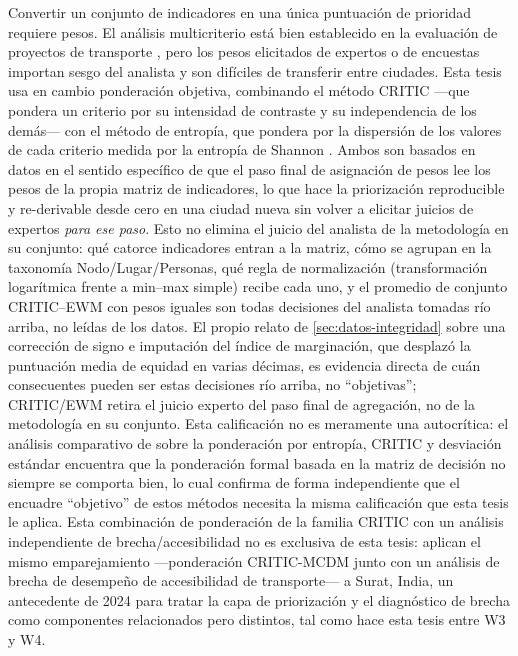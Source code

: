 Convertir un conjunto de indicadores en una única puntuación de prioridad requiere pesos.
El análisis multicriterio está bien establecido en la evaluación de proyectos de transporte
\parencite{macharis2015}, pero los pesos elicitados de expertos o de encuestas importan
sesgo del analista y son difíciles de transferir entre ciudades. Esta tesis usa en cambio
ponderación objetiva, combinando el método CRITIC \parencite{diakoulaki1995critic} ---que
pondera un criterio por su intensidad de contraste y su independencia de los demás--- con
el método de entropía, que pondera por la dispersión de los valores de cada criterio medida
por la entropía de Shannon \parencite{shannon1948}. Ambos son basados en datos en el
sentido específico de que el paso final de asignación de pesos lee los pesos de la propia
matriz de indicadores, lo que hace la priorización reproducible y re-derivable desde cero
en una ciudad nueva sin volver a elicitar juicios de expertos \emph{para ese paso}. Esto no
elimina el juicio del analista de la metodología en su conjunto: qué catorce indicadores
entran a la matriz, cómo se agrupan en la taxonomía Nodo/Lugar/Personas, qué regla de
normalización (transformación logarítmica frente a min--max simple) recibe cada uno, y el
promedio de conjunto CRITIC--EWM con pesos iguales son todas decisiones del analista
tomadas río arriba, no leídas de los datos. El propio relato de
\cref{sec:datos-integridad} sobre una corrección de signo e imputación del índice de
marginación, que desplazó la puntuación media de equidad en varias décimas, es evidencia
directa de cuán consecuentes pueden ser estas decisiones río arriba, no ``objetivas'';
CRITIC/EWM retira el juicio experto del paso final de agregación, no de la metodología en
su conjunto. Esta calificación no es meramente una autocrítica: el análisis comparativo de
\textcite{mukhametzyanov2021critic} sobre la ponderación por entropía, CRITIC y desviación
estándar encuentra que la ponderación formal basada en la matriz de decisión no siempre se
comporta bien, lo cual confirma de forma independiente que el encuadre ``objetivo'' de
estos métodos necesita la misma calificación que esta tesis le aplica. Esta combinación de
ponderación de la familia CRITIC con un análisis independiente de brecha/accesibilidad no
es exclusiva de esta tesis: \textcite{rathod2024critic} aplican el mismo emparejamiento
---ponderación CRITIC-MCDM junto con un análisis de brecha de desempeño de accesibilidad de
transporte--- a Surat, India, un antecedente de 2024 para tratar la capa de priorización y
el diagnóstico de brecha como componentes relacionados pero distintos, tal como hace esta
tesis entre W3 y W4.

